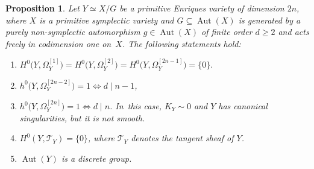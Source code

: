 \documentclass[JEP,XML,SOM,Unicode,published]{cedram}
\theoremstyle{plain}
\newtheorem{prop}[thm]{Proposition}
\theoremstyle{definition}
\DeclareMathOperator{\Aut}{Aut}
\begin{document}
\begin{prop}
\label{prop:basic_prop_PEV}
Let $Y \simeq X / G$ be a primitive Enriques variety of dimension $2n$, where $X$ is a primitive symplectic variety and $G \subseteq \Aut(X)$ is generated by a purely non-symplectic automorphism $g \in \Aut(X)$ of finite order $d \geq 2$ and acts freely in codimension one on~$X$. The following statements hold:
\begin{enumerate}
\item
\label{prop:basic_prop_PEVi}
$
H^0 \bigl(Y,\Omega_Y^{[1]} \bigr) = H^0 \bigl(Y,\Omega_Y^{[2]} \bigr) = H^0 \bigl(Y,\Omega_Y^{[2n - 1]} \bigr) = \{ 0 \}.
$
\smallskip
\item
\label{prop:basic_prop_PEVii}
$h^0 \bigl(Y, \Omega^{[2n-2]}_Y \bigr) = 1 \iff d \mid n-1$,

\item
\label{prop:basic_prop_PEViii}
$h^0 \bigl(Y, \Omega^{[2n]}_Y \bigr) = 1 \iff d \mid n$. In~this case, $K_Y \sim 0$ and $Y$ has canonical singularities, but it is not smooth.

\item\label{prop:basic_prop_PEViv}
$H^0(Y,\mathscr{T}_Y) = \{ 0 \}$, where $\mathscr{T}_Y$ denotes the tangent sheaf of $Y$.

\item\label{prop:basic_prop_PEVv}
$\Aut(Y)$ is a discrete group.
\end{enumerate}
\end{prop}
\end{document}
